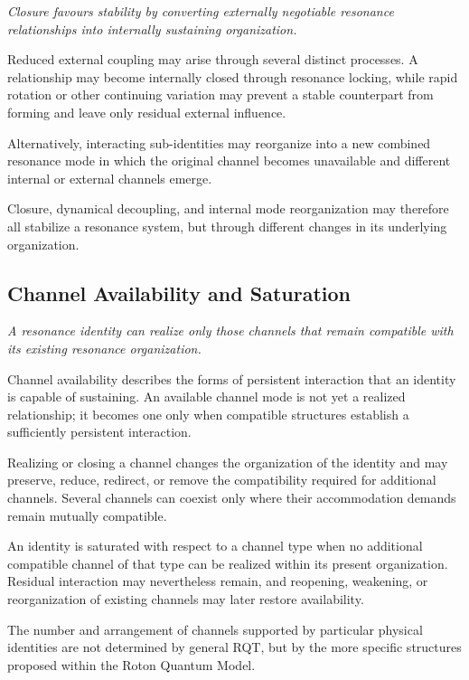 \documentclass[11pt,a4paper]{article}
\begin{document}
\emph{Closure favours stability by converting externally negotiable resonance relationships into internally sustaining organization.}
\vspace{0.6em}

Reduced external coupling may arise through several distinct processes. A relationship may become internally closed through resonance locking, while rapid rotation or other continuing variation may prevent a stable counterpart from forming and leave only residual external influence.

Alternatively, interacting sub-identities may reorganize into a new combined resonance mode in which the original channel becomes unavailable and different internal or external channels emerge.

Closure, dynamical decoupling, and internal mode reorganization may therefore all stabilize a resonance system, but through different changes in its underlying organization.

\subsection{Channel Availability and Saturation}

\emph{A resonance identity can realize only those channels that remain compatible with its existing resonance organization.}
\vspace{0.6em}

Channel availability describes the forms of persistent interaction that an identity is capable of sustaining. An available channel mode is not yet a realized relationship; it becomes one only when compatible structures establish a sufficiently persistent interaction.

Realizing or closing a channel changes the organization of the identity and may preserve, reduce, redirect, or remove the compatibility required for additional channels. Several channels can coexist only where their accommodation demands remain mutually compatible.

An identity is saturated with respect to a channel type when no additional compatible channel of that type can be realized within its present organization. Residual interaction may nevertheless remain, and reopening, weakening, or reorganization of existing channels may later restore availability.

The number and arrangement of channels supported by particular physical identities are not determined by general RQT, but by the more specific structures proposed within the Roton Quantum Model.
\end{document}
